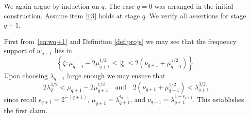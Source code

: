 \documentclass[12pt,reqno,letterpaper]{amsart}
\numberwithin{equation}{section}
\newcommand{\1}{{\bf 1}}
\newcommand{\2}{{\bf 2}}
\theoremstyle{remark}
\theoremstyle{remark}
\begin{document}
We again argue by induction on $q$. The case $q=0$ was arranged in the initial construction. Assume item \ref{i:3} holds at stage $q$. We verify all assertions for stage $q+1$.

First from~\eqref{eq:wq+1} and Definition \ref{def:projs} we may see that the frequency support of $w_{q+1}$ lies in
$$
\left\{\xi : \mu_{q+1} - 2\mu_{q+1}^{1/2} \leq |\xi| \leq 2\left(\nu_{q+1} + \mu_{q+1}^{1/2}\right)\right\}.
$$
Upon choosing $\lambda_{q+1}$ large enough we may ensure that
\begin{equation}\label{eq:support_cond}
    2\lambda_q^{3/2} < \mu_{q+1} - 2\mu_{q+1}^{1/2} \quad \text{and} \quad 2\left(\nu_{q+1} + \mu_{q+1}^{1/2}\right) < \lambda_{q+1}^{3/2}
\end{equation}
since recall $\epsilon_{q+1} = 2^{-(q+1)}$, $\mu_{q+1} = \lambda_{q+1}^{\epsilon_{q+1}}$, and $\nu_{q+1} = \lambda_{q+1}^{1 + \epsilon_{q+1}}$. This establishes the first claim.
\end{document}
